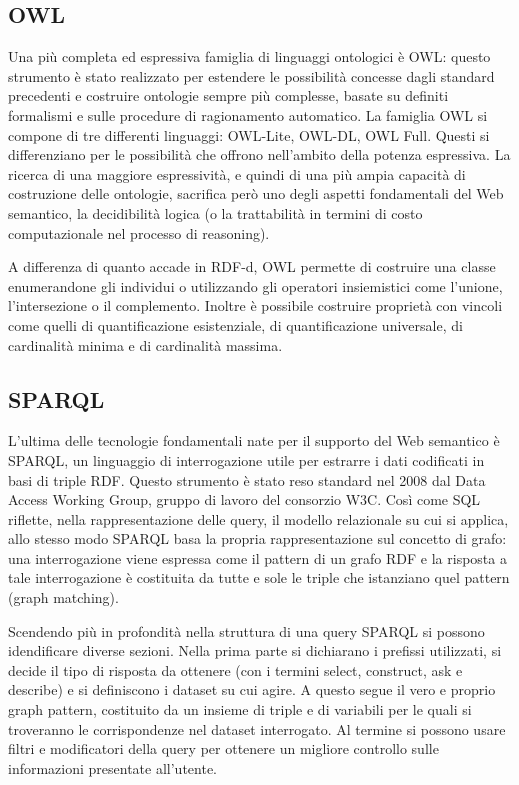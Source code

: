 \documentclass[Lau,binding=0.6cm,noexaminfo,oneside]{sapthesis}
\begin{document}
\subsection{OWL}
Una più completa ed espressiva famiglia di linguaggi ontologici è OWL: questo strumento è stato realizzato per estendere le possibilità concesse dagli standard precedenti e costruire ontologie sempre più complesse, basate su definiti formalismi e sulle procedure di ragionamento automatico. La famiglia OWL si compone di tre differenti linguaggi: OWL-Lite, OWL-DL, OWL Full.
Questi si differenziano per le possibilità che offrono nell'ambito della potenza espressiva. La ricerca di una maggiore espressività, e quindi di una più ampia capacità di costruzione delle ontologie, sacrifica però uno degli aspetti fondamentali del Web semantico, la decidibilità logica (o la trattabilità in termini di costo computazionale nel processo di reasoning).\medskip

A differenza di quanto accade in RDF-d, OWL permette di costruire una classe enumerandone gli individui o utilizzando gli operatori insiemistici come l'unione, l'intersezione o il complemento. Inoltre è possibile costruire proprietà con vincoli come quelli di quantificazione esistenziale,  di quantificazione universale, di cardinalità minima e di cardinalità massima.\medskip

\subsection{SPARQL}
L'ultima delle tecnologie fondamentali nate per il supporto del Web semantico è SPARQL, un linguaggio di interrogazione utile per estrarre i dati codificati in basi di triple RDF. Questo strumento è stato reso standard nel 2008 dal Data Access Working Group, gruppo di lavoro del consorzio W3C. Così come SQL riflette, nella rappresentazione delle query, il modello relazionale su cui si applica, allo stesso modo SPARQL basa la propria rappresentazione sul concetto di grafo: una interrogazione viene espressa come il pattern di un grafo RDF e la risposta a tale interrogazione è costituita da tutte e sole le triple che istanziano quel pattern (graph matching).\medskip

Scendendo più in profondità nella struttura di una query SPARQL si possono idendificare diverse sezioni. Nella prima parte si dichiarano i prefissi utilizzati, si decide il tipo di risposta da ottenere (con i termini select, construct, ask e describe) e si definiscono i dataset su cui agire. A questo segue il vero e proprio graph pattern, costituito da un insieme di triple e di variabili per le quali si troveranno le corrispondenze nel dataset interrogato. Al termine si possono usare filtri e modificatori della query per ottenere un migliore controllo sulle informazioni presentate all'utente.\medskip
\end{document}
